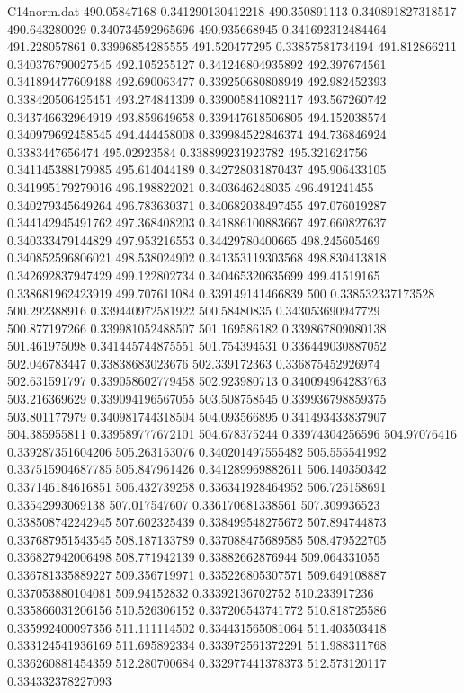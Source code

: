 \begin{filecontents}{C14norm.dat}
490.05847168			0.341290130412218
490.350891113			0.340891827318517
490.643280029			0.340734592965696
490.935668945			0.341692312484464
491.228057861			0.33996854285555
491.520477295			0.33857581734194
491.812866211			0.340376790027545
492.105255127			0.341246804935892
492.397674561			0.341894477609488
492.690063477			0.339250680808949
492.982452393			0.338420506425451
493.274841309			0.339005841082117
493.567260742			0.343746632964919
493.859649658			0.339447618506805
494.152038574			0.340979692458545
494.444458008			0.339984522846374
494.736846924			0.3383447656474
495.02923584			0.338899231923782
495.321624756			0.341145388179985
495.614044189			0.342728031870437
495.906433105			0.341995179279016
496.198822021			0.3403646248035
496.491241455			0.340279345649264
496.783630371			0.340682038497455
497.076019287			0.344142945491762
497.368408203			0.341886100883667
497.660827637			0.340333479144829
497.953216553			0.34429780400665
498.245605469			0.340852596806021
498.538024902			0.341353119303568
498.830413818			0.342692837947429
499.122802734			0.340465320635699
499.41519165			0.338681962423919
499.707611084			0.339149141466839
500			0.338532337173528
500.292388916			0.339440972581922
500.58480835			0.343053690947729
500.877197266			0.339981052488507
501.169586182			0.339867809080138
501.461975098			0.341445744875551
501.754394531			0.336449030887052
502.046783447			0.33838683023676
502.339172363			0.336875452926974
502.631591797			0.339058602779458
502.923980713			0.340094964283763
503.216369629			0.339094196567055
503.508758545			0.339936798859375
503.801177979			0.340981744318504
504.093566895			0.341493433837907
504.385955811			0.339589777672101
504.678375244			0.33974304256596
504.97076416			0.339287351604206
505.263153076			0.340201497555482
505.555541992			0.337515904687785
505.847961426			0.341289969882611
506.140350342			0.337146184616851
506.432739258			0.336341928464952
506.725158691			0.33542993069138
507.017547607			0.336170681338561
507.309936523			0.338508742242945
507.602325439			0.338499548275672
507.894744873			0.337687951543545
508.187133789			0.337088475689585
508.479522705			0.336827942006498
508.771942139			0.33882662876944
509.064331055			0.336781335889227
509.356719971			0.335226805307571
509.649108887			0.337053880104081
509.94152832			0.33392136702752
510.233917236			0.335866031206156
510.526306152			0.337206543741772
510.818725586			0.335992400097356
511.111114502			0.334431565081064
511.403503418			0.333124541936169
511.695892334			0.333972561372291
511.988311768			0.336260881454359
512.280700684			0.332977441378373
512.573120117			0.334332378227093

\end{filecontents}
